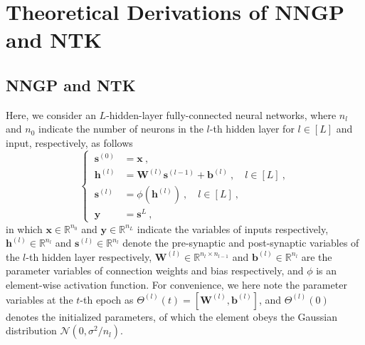 \documentclass[review,10pt]{JMtemplate}
\begin{document}
\section{Theoretical Derivations of NNGP and NTK}  \label{app:two}
\subsection{NNGP and NTK}  
Here, we consider an $L$-hidden-layer fully-connected neural networks, where $n_l$ and $n_0$ indicate the number of neurons in the $l$-th hidden layer for $l \in [L]$ and input, respectively, as follows
\[
\left\{~\begin{aligned}
\boldsymbol{s}^{(0)} &= \boldsymbol{x} \ , \\
\boldsymbol{h}^{(l)} &= \mathbf{W}^{(l)} \boldsymbol{s}^{(l-1)} + \boldsymbol{b}^{(l)} \ ,\quad l \in [L] \ , \\
\boldsymbol{s}^{(l)} &= \phi( \boldsymbol{h}^{(l)} ) \ ,\quad l \in [L] \ , \\
\boldsymbol{y} &= \boldsymbol{s}^{L} \ ,
\end{aligned}\right.
\]
in which $\boldsymbol{x} \in \mathbb{R}^{n_0}$ and $\boldsymbol{y} \in \mathbb{R}^{n_L}$ indicate the variables of inputs respectively, $\boldsymbol{h}^{(l)} \in \mathbb{R}^{n_l}$ and $\boldsymbol{s}^{(l)} \in \mathbb{R}^{n_l}$ denote the pre-synaptic and post-synaptic variables of the $l$-th hidden layer respectively,  $\mathbf{W}^{(l)} \in \mathbb{R}^{n_l \times n_{l-1}} $ and $\boldsymbol{b}^{(l)} \in \mathbb{R}^{n_l} $ are the parameter variables of connection weights and bias respectively, and $\phi$ is an element-wise activation function. For convenience, we here note the parameter variables at the $t$-th epoch as $\Theta^{(l)}(t) = [ \mathbf{W}^{(l)}, \boldsymbol{b}^{(l)} ]$, and $\Theta^{(l)}(0)$ denotes the initialized parameters, of which the element obeys the Gaussian distribution $\mathcal{N}(0, \sigma^2/n_l)$.
\end{document}
